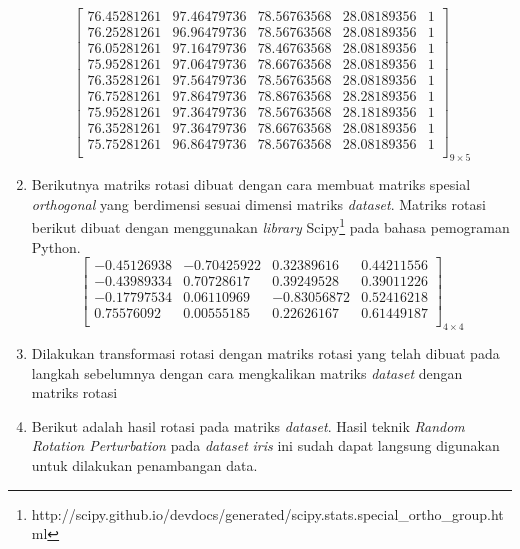 \begin{enumerate}
    \[
        \begin{bmatrix}
            76.45281261  & 97.46479736 &  78.56763568 &  28.08189356 & 1 \\
            76.25281261  & 96.96479736 &  78.56763568 &  28.08189356 & 1 \\
            76.05281261  & 97.16479736 &  78.46763568 &  28.08189356 & 1 \\
            75.95281261  & 97.06479736 &  78.66763568 &  28.08189356 & 1 \\
            76.35281261  & 97.56479736 &  78.56763568 &  28.08189356 & 1 \\
            76.75281261  & 97.86479736 &  78.86763568 &  28.28189356 & 1 \\
            75.95281261  & 97.36479736 &  78.56763568 &  28.18189356 & 1 \\
            76.35281261  & 97.36479736 &  78.66763568 &  28.08189356 & 1 \\
            75.75281261  & 96.86479736 &  78.56763568 &  28.08189356 & 1 \\
        \end{bmatrix}_{9\times 5}
    \]
    \item Berikutnya matriks rotasi dibuat dengan cara membuat matriks spesial \textit{orthogonal} yang berdimensi sesuai dimensi matriks \textit{dataset}. Matriks rotasi berikut dibuat dengan menggunakan \textit{library} Scipy\footnote{http://scipy.github.io/devdocs/generated/scipy.stats.special\_ortho\_group.html} pada bahasa pemograman Python.
    \[
        \begin{bmatrix}
            -0.45126938		&		-0.70425922		&		 0.32389616		&		0.44211556 \\
            -0.43989334		&		 0.70728617		&		 0.39249528		&		0.39011226 \\
            -0.17797534		&		 0.06110969		&		-0.83056872		&		0.52416218 \\
             0.75576092		&		 0.00555185		&		 0.22626167		&		0.61449187 \\
        \end{bmatrix}_{4\times 4}
    \]
    \item Dilakukan transformasi rotasi dengan matriks rotasi yang telah dibuat pada langkah sebelumnya dengan cara mengkalikan matriks \textit{dataset} dengan matriks rotasi
    \item Berikut adalah hasil rotasi pada matriks \textit{dataset}. Hasil teknik \textit{Random Rotation Perturbation} pada \textit{dataset} \textit{iris} ini sudah dapat langsung digunakan untuk dilakukan penambangan data.

\end{enumerate}
